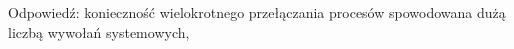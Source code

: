 Odpowiedź: konieczność wielokrotnego przełączania procesów spowodowana dużą liczbą wywołań systemowych,
